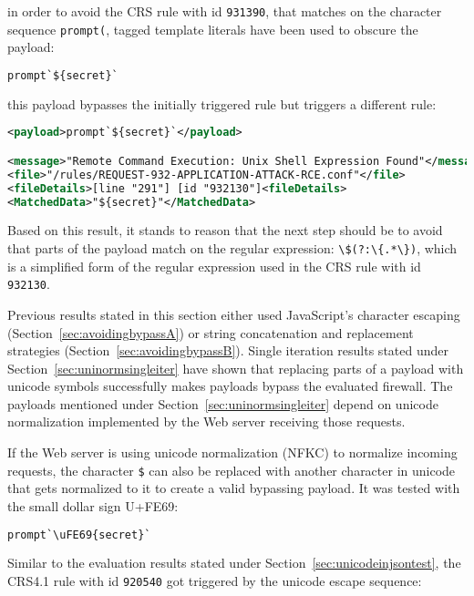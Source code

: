 in order to avoid the CRS rule with id \verb|931390|, that matches on the character sequence \verb|prompt(|, tagged template literals have been used to obscure the payload:

\begin{lstlisting}[style=basicStyle, escapeinside=\^\^, language=Python]
prompt`${secret}`
\end{lstlisting}

this payload bypasses the initially triggered rule but triggers a different rule:

\begin{lstlisting}[style=ruleStyle, language=XML]
<payload>prompt`${secret}`</payload>

<message>"Remote Command Execution: Unix Shell Expression Found"</message>
<file>"/rules/REQUEST-932-APPLICATION-ATTACK-RCE.conf"</file>
<fileDetails>[line "291"] [id "932130"]<fileDetails>
<MatchedData>"${secret}"</MatchedData>
\end{lstlisting}

Based on this result, it stands to reason that the next step should be to avoid that parts of the payload match on the regular expression: \verb|\$(?:\{.*\})|, which is a simplified form of the regular expression used in the CRS rule with id \verb|932130|.

Previous results stated in this section either used JavaScript's character escaping (Section~\ref{sec:avoidingbypassA}) or string concatenation and replacement strategies (Section~\ref{sec:avoidingbypassB}). Single iteration results stated under Section~\ref{sec:uninormsingleiter} have shown that replacing parts of a payload with unicode symbols successfully makes payloads bypass the evaluated firewall. The payloads mentioned under Section~\ref{sec:uninormsingleiter} depend on unicode normalization implemented by the Web server receiving those requests. 

If the Web server is using unicode normalization (NFKC) to normalize incoming requests, the character \verb|$| can also be replaced with another character in unicode that gets normalized to it to create a valid bypassing payload. It was tested with the small dollar sign U+FE69: 

\begin{lstlisting}[style=basicStyle, language=Python]
prompt`\uFE69{secret}`
\end{lstlisting}

Similar to the evaluation results stated under Section~\ref{sec:unicodeinjsontest}, the CRS4.1 rule with id \verb|920540| got triggered by the unicode escape sequence:

